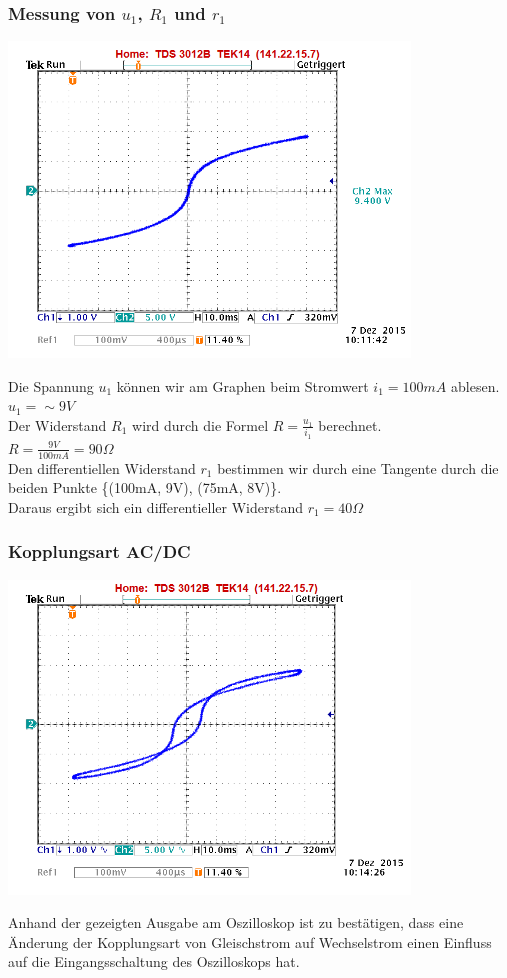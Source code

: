 \documentclass[11pt,a4paper,titlepage]{article}
\begin{document}
\subsubsection{Messung von $u_1$, $R_1$ und $r_1$} 
\begin{center}
\includegraphics[width=0.8\textwidth]{5_2_1}
\end{center}
Die Spannung $u_1$ k\"onnen wir am Graphen beim Stromwert $i_1 = 100mA$ ablesen. \\[1ex]
$u_1 = \sim 9V$ \\[1ex]
Der Widerstand $R_1$ wird durch die Formel $R=\frac{u_1}{i_1}$ berechnet. \\[1ex]
$R=\frac{9V}{100mA}=90\Omega$ \\[1ex]
Den differentiellen Widerstand $r_1$ bestimmen wir durch eine Tangente durch die beiden Punkte \{(100mA, 9V), (75mA, 8V)\}. \\[1ex]
Daraus ergibt sich ein differentieller Widerstand $r_1 = 40\Omega$
\newpage
\subsubsection{Kopplungsart AC/DC}
\begin{center}
\includegraphics[width=0.8\textwidth]{5_2_2}
\end{center}
Anhand der gezeigten Ausgabe am Oszilloskop ist zu best\"atigen, dass eine \"Anderung der Kopplungsart von Gleischstrom auf Wechselstrom einen Einfluss auf die Eingangsschaltung des Oszilloskops hat.
\end{document}
